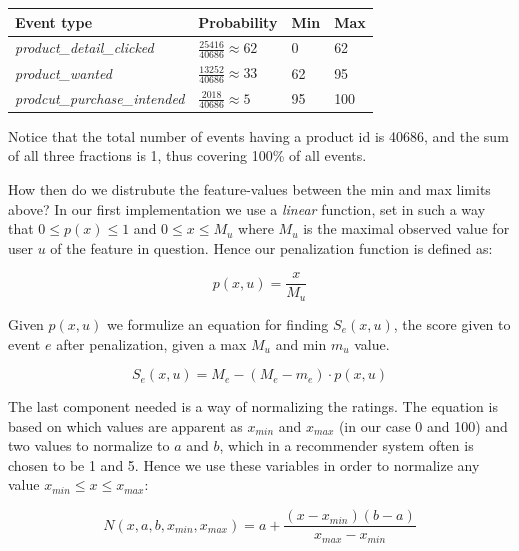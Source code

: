 \begin{table}[H]
  \centering
  \begin{tabular}{llll}
    \toprule
      Event type & Probability & Min & Max \\
    \midrule
      \textit{product\_detail\_clicked}     & $\frac{25416}{40686} \approx 62$  & 0   & 62  \\[1.5ex]
      \textit{product\_wanted}              & $\frac{13252}{40686} \approx 33$  & 62  & 95  \\[1.5ex]
      \textit{prodcut\_purchase\_intended}  & $\frac{2018}{40686} \approx 5$    & 95  & 100 \\
    \bottomrule
  \end{tabular}
\end{table}

Notice that the total number of events having a product id is 40686, and the
sum of all three fractions is 1, thus covering 100\% of all events.

How then do we distrubute the feature-values  between the min and max limits
above? In our first implementation we use a \textit{linear} function, set in
such a way that $0 \leq p(x) \leq 1$ and $0 \leq x \leq M_u$ where $M_u$ is the
maximal observed value for user $u$ of the feature in question. Hence our
penalization function is defined as:

\begin{equation}
  p(x, u) = \frac{x}{M_u}
\end{equation}

Given $p(x, u)$ we formulize an equation for finding $S_e(x, u)$, the score
given to event $e$ after penalization, given a max $M_u$ and min $m_u$ value.

\begin{equation}
  S_e(x,u) = M_e - (M_e - m_e) \cdot p(x, u)
\end{equation}

The last component needed is a way of normalizing the ratings. The equation is
based on which values are apparent as $x_{min}$ and $x_{max}$ (in our case 0
and 100) and two values to normalize to $a$ and $b$, which in a recommender
system often is chosen to be 1 and 5. Hence we use these variables in order to
normalize any value $x_{min} \leq x \leq x_{max}$:

\begin{equation}
  \label{eq-normalization}
  N(x, a, b, x_{min}, x_{max}) = a + \frac{(x-x_{min})(b-a)}{x_{max}-x_{min}}
\end{equation}

